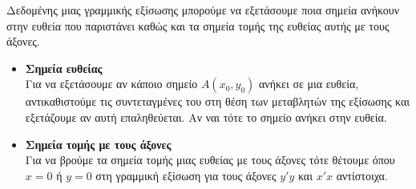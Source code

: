 Δεδομένης μιας γραμμικής εξίσωσης μπορούμε να εξετάσουμε ποια σημεία ανήκουν στην ευθεία που παριστάνει καθώς και τα σημεία τομής της ευθείας αυτής με τους άξονες.
\begin{itemize}[leftmargin=3mm]
\item \textbf{Σημεία ευθείας}\\
Για να εξετάσουμε αν κάποιο σημείο $ A(x_0,y_0) $ ανήκει σε μια ευθεία, αντικαθιστούμε τις συντεταγμένες του στη θέση των μεταβλητών της εξίσωσης και εξετάζουμε αν αυτή επαληθεύεται. Αν ναι τότε το σημείο ανήκει στην ευθεία.
\item \textbf{Σημεία τομής με τους άξονες}\\
Για να βρούμε τα σημεία τομής μιας ευθείας με τους άξονες τότε θέτουμε όπου $ x=0 $ ή $ y=0 $ στη γραμμική εξίσωση για τους άξονες $ y'y $ και $ x'x $ αντίστοιχα.
\end{itemize}
